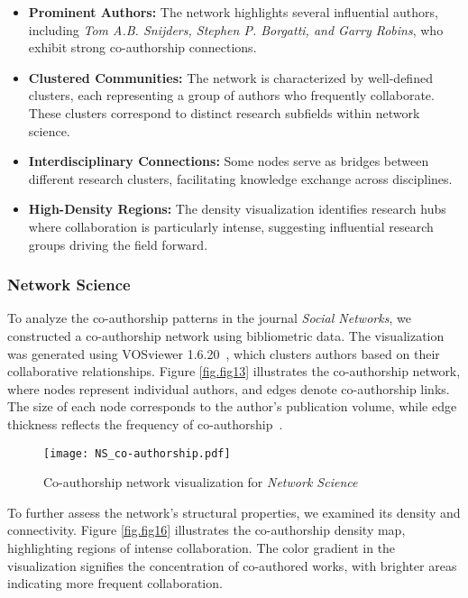 \documentclass[twocolumn]{article}
\begin{document}
		\begin{itemize}
			\item \textbf{Prominent Authors:} The network highlights several influential authors, including \textit{Tom A.B. Snijders, Stephen P. Borgatti, and Garry Robins}, who exhibit strong co-authorship connections.
			\item \textbf{Clustered Communities:} The network is characterized by well-defined clusters, each representing a group of authors who frequently collaborate. These clusters correspond to distinct research subfields within network science.
			\item \textbf{Interdisciplinary Connections:} Some nodes serve as bridges between different research clusters, facilitating knowledge exchange across disciplines.
			\item \textbf{High-Density Regions:} The density visualization identifies research hubs where collaboration is particularly intense, suggesting influential research groups driving the field forward.
		\end{itemize}
		
		\subsubsection*{Network Science}
		
		To analyze the co-authorship patterns in the journal \textit{Social Networks}, we constructed a co-authorship network using bibliometric data. The visualization was generated using VOSviewer 1.6.20~\cite{vanEck2010vosviewer}, which clusters authors based on their collaborative relationships. Figure \ref{fig.fig13} illustrates the co-authorship network, where nodes represent individual authors, and edges denote co-authorship links. The size of each node corresponds to the author's publication volume, while edge thickness reflects the frequency of co-authorship~\cite{glanzel2004handbook, newman2004coauthorship}.
		
		
		\begin{figure}[htbp]
			\centering
			\texttt{[image: NS\_co-authorship.pdf]}
			\caption{Co-authorship network visualization for \textit{Network Science}}
			\label{fig.fig15}
		\end{figure}
		
		To further assess the network’s structural properties, we examined its density and connectivity. Figure \ref{fig.fig16} illustrates the co-authorship density map, highlighting regions of intense collaboration. The color gradient in the visualization signifies the concentration of co-authored works, with brighter areas indicating more frequent collaboration.
		
\end{document}
